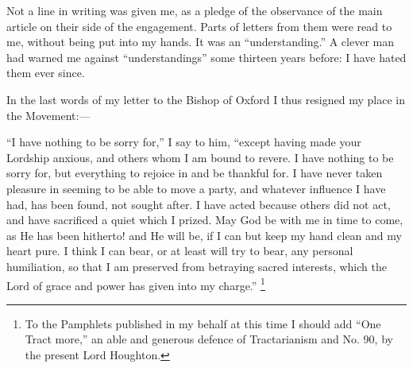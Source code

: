 Not a line in writing was given me, as a pledge of the observance of the main article on their side
of the engagement. Parts of letters from them were read to me, without
being put into my hands. It was an ``understanding.'' A clever
man had warned me against ``understandings'' some thirteen years
before: I have hated them ever since.

In the last words of my letter to the Bishop of Oxford I thus
resigned my place in the Movement:—

``I have nothing to be sorry for,'' I say to him,
``except having made your Lordship anxious, and others whom I am
bound to revere. I have nothing to be sorry for, but everything to
rejoice in and be thankful for. I have never taken pleasure in seeming
to be able to move a party, and whatever influence I have had, has been
found, not sought after. I have acted because others did not act, and
have sacrificed a quiet which I prized. May God be with me in time to
come, as He has been hitherto! and He will be, if I can but keep my hand
clean and my heart pure. I think I can bear, or at least will try to
bear, any personal humiliation, so that I am preserved from betraying
sacred interests, which the Lord of grace and power has given into my
charge.'' \footnote{To the Pamphlets published in my behalf at
this time I should add ``One Tract more,'' an able and generous
defence of Tractarianism and No. 90, by the present Lord Houghton.}


